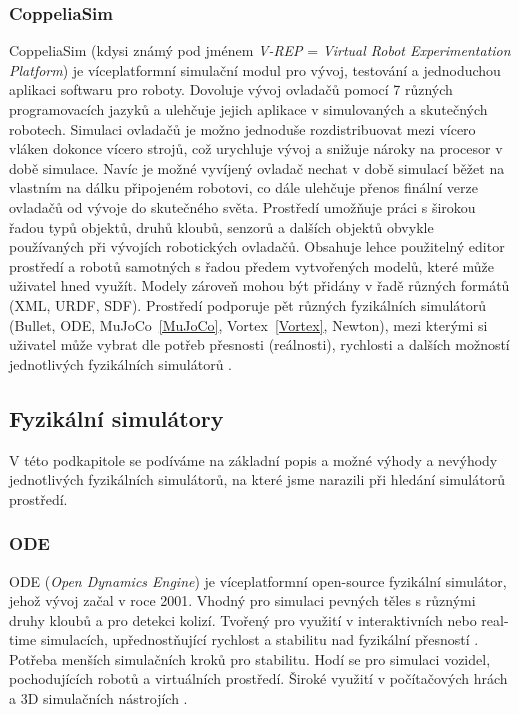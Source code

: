 \subsubsection{CoppeliaSim} \label{CoppeliaSim}
CoppeliaSim \citep{coppeliaSim} (kdysi známý pod jménem \emph{V-REP} =
\emph{Virtual Robot Experimentation Platform}) je víceplatformní simulační
modul pro vývoj, testování a jednoduchou aplikaci softwaru pro roboty. Dovoluje
vývoj ovladačů pomocí 7 různých programovacích jazyků a ulehčuje jejich
aplikace v simulovaných a skutečných robotech. Simulaci ovladačů je možno
jednoduše rozdistribuovat mezi vícero vláken dokonce vícero strojů, což
urychluje vývoj a snižuje nároky na procesor v době simulace. Navíc je možné
vyvíjený ovladač nechat v době simulací běžet na vlastním na dálku připojeném
robotovi, co dále ulehčuje přenos finální verze ovladačů od vývoje do
skutečného světa. Prostředí umožňuje práci s širokou řadou typů objektů, druhů
kloubů, senzorů a dalších objektů obvykle používaných při vývojích robotických
ovladačů. Obsahuje lehce použitelný editor prostředí a robotů samotných s řadou
předem vytvořených modelů, které může uživatel hned využít. Modely zároveň
mohou být přidány v řadě různých formátů (XML, URDF, SDF). Prostředí
podporuje pět různých fyzikálních simulátorů (Bullet, ODE, MuJoCo~\ref{MuJoCo},
Vortex~\ref{Vortex}, Newton), mezi kterými si uživatel může vybrat dle potřeb
přesnosti (reálnosti), rychlosti a dalších možností jednotlivých fyzikálních
simulátorů \citep{nogueira2014comparative}.

\subsection{Fyzikální simulátory} \label{Simulované prostředí - f simulátory}

V této podkapitole se podíváme na základní popis a možné výhody a nevýhody
jednotlivých fyzikálních simulátorů, na které jsme narazili při hledání
simulátorů prostředí.

\subsubsection{ODE} \label{ODE}
ODE (\emph{Open Dynamics Engine}) \citep{opendynamicsengine} je víceplatformní open-source fyzikální
simulátor, jehož vývoj začal v roce 2001. Vhodný pro simulaci pevných těles s
různými druhy kloubů a pro detekci kolizí. Tvořený pro využití v interaktivních
nebo real-time simulacích, upřednostňující rychlost a stabilitu nad fyzikální
přesností \citep{smith2007open}. Potřeba menších simulačních kroků pro
stabilitu. Hodí se pro simulaci vozidel, pochodujících robotů a virtuálních
prostředí. Široké využití v počítačových hrách a 3D simulačních nástrojích
\citet{coppeliarobotics}.


